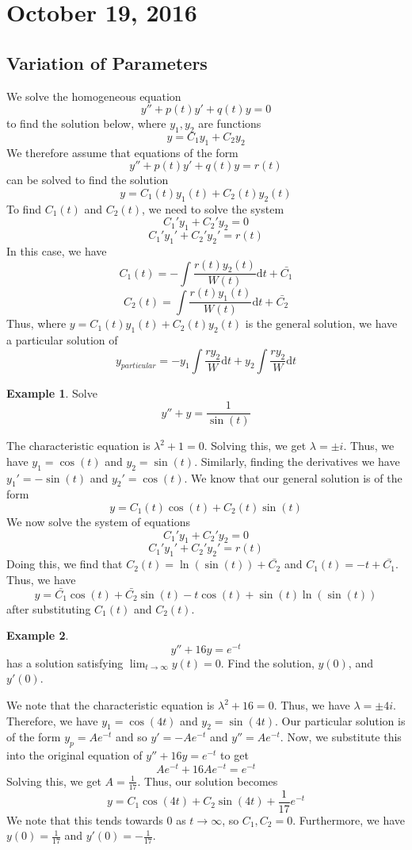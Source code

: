 \documentclass[11pt]{article}
\theoremstyle{plain} %
\theoremstyle{definition}
\theoremstyle{example}
\newtheorem*{example}{Example}
\theoremstyle{remark}
\begin{document}
\section{October 19, 2016}
\subsection{Variation of Parameters}

We solve the homogeneous equation 
$$y'' + p(t)y'  + q(t)y = 0$$ to find the solution below, where $y_1, y_2$ are functions $$y = C_1y_1 + C_2y_2$$ We therefore assume that equations of the form $$y'' + p(t)y'  + q(t)y = r(t)$$ can be solved to find the solution $$y = C_1(t)y_1(t) + C_2(t)y_2(t)$$ To find $C_1(t)$ and $C_2(t)$, we need to solve the system $$C_1'y_1 + C_2'y_2 = 0$$ $$C_1'y_1' + C_2'y_2' = r(t)$$ In this case, we have $$C_1(t) = -\int \frac{r(t)y_2(t)}{W(t)}\mathrm d t + \bar{C_1}$$ $$C_2(t) = \int \frac{r(t)y_1(t)}{W(t)}\mathrm d t + \bar{C_2}$$ Thus, where $y = C_1(t)y_1(t) + C_2(t)y_2(t)$ is the general solution, we have a particular solution of $$y_{particular} = -y_1\int \frac{ry_2}{W}\mathrm d t + y_2 \int \frac{ry_2}{W}\mathrm d t$$


\begin{example}
Solve $$y'' + y = \frac{1}{\sin(t)}$$
\end{example}

The characteristic equation is $\lambda^2 + 1 = 0$. Solving this, we get $\lambda = \pm i$. Thus, we have $y_1 = \cos(t)$ and $y_2 = \sin(t)$. Similarly, finding the derivatives we have $y_1' = -\sin(t)$ and $y_2' = \cos(t)$. We know that our general solution is of the form $$y = C_1(t)\cos(t) + C_2(t)\sin(t)$$ We now solve the system of equations $$C_1'y_1 + C_2'y_2 = 0$$ $$C_1'y_1' + C_2'y_2' = r(t)$$ Doing this, we find that $C_2(t) = \ln(\sin(t)) + \bar{C_2}$ and $C_1(t) = -t + \bar{C_1}$. Thus, we have $$y = \bar{C_1}\cos(t) + \bar{C_2}\sin(t) -t\cos(t) + \sin(t)\ln(\sin(t))$$ after substituting $C_1(t)$ and $C_2(t)$. 

\begin{example}
$$y'' + 16y = e^{-t}$$ has a solution satisfying $\lim_{t \to \infty} y(t) = 0$. Find the solution, $y(0)$, and $y'(0)$. 
\end{example}

We note that the characteristic equation is $\lambda ^2 + 16 =0$. Thus, we have $\lambda = \pm 4i$. Therefore, we have $y_1 = \cos(4t)$ and $y_2 = \sin(4t)$. Our particular solution is of the form $y_p = Ae^{-t}$ and so $y' = -Ae^{-t}$ and $y'' = Ae^{-t}$. Now, we substitute this into the original equation of $y'' + 16y = e^{-t}$ to get 
$$Ae^{-t} + 16Ae^{-t} = e^{-t}$$ Solving this, we get $A = \frac{1}{17}$. Thus, our solution becomes $$y = C_1\cos(4t) + C_2\sin(4t) + \frac{1}{17}e^{-t}$$ We note that this tends towards 0 as $t \to \infty$, so $C_1, C_2 = 0$. Furthermore, we have $y(0) = \frac{1}{17}$ and $y'(0) = -\frac{1}{17}$. 
\end{document}
